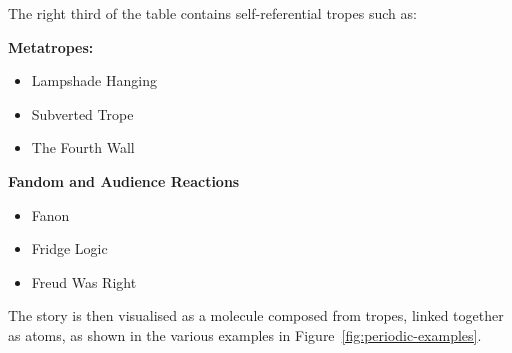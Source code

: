 \documentclass[11pt]{report}
\begin{document}
The right third of the table contains self-referential tropes such as:

\textbf{Metatropes:}
\begin{itemize}
  \item Lampshade Hanging
  \item Subverted Trope
  \item The Fourth Wall
\end{itemize}

\textbf{Fandom and Audience Reactions}
\begin{itemize}
  \item Fanon
  \item Fridge Logic
  \item Freud Was Right
\end{itemize}

The story is then visualised as a molecule composed from tropes, linked together as
atoms, as shown in the various examples in Figure~\ref{fig:periodic-examples}.
\end{document}
